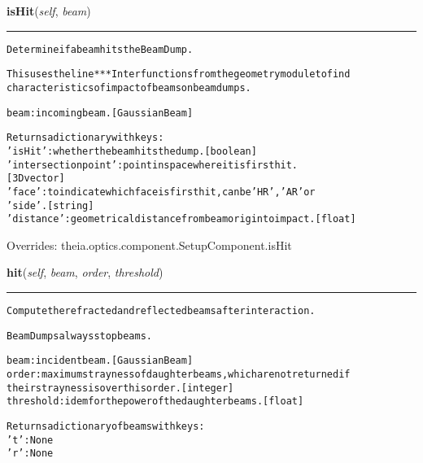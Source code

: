 \hspace{.8\funcindent}\begin{boxedminipage}{\funcwidth}

    \raggedright \textbf{isHit}(\textit{self}, \textit{beam})

    \vspace{-1.5ex}

    \rule{\textwidth}{0.5\fboxrule}
\setlength{\parskip}{2ex}
\begin{alltt}
Determine if a beam hits the BeamDump.

This uses the line***Inter functions from the geometry module to find
characteristics of impact of beams on beamdumps.

beam: incoming beam. [GaussianBeam]

Returns a dictionary with keys:
    'isHit': whether the beam hits the dump. [boolean]
    'intersection point': point in space where it is first hit.
        [3D vector]
    'face': to indicate which face is first hit, can be 'HR', 'AR' or
        'side'. [string]
    'distance': geometrical distance from beam origin to impact. [float]
\end{alltt}

\setlength{\parskip}{1ex}
      Overrides: theia.optics.component.SetupComponent.isHit

    \end{boxedminipage}

    \label{theia:optics:beamdump:BeamDump:hit}

    \vspace{0.5ex}

\hspace{.8\funcindent}\begin{boxedminipage}{\funcwidth}

    \raggedright \textbf{hit}(\textit{self}, \textit{beam}, \textit{order}, \textit{threshold})

    \vspace{-1.5ex}

    \rule{\textwidth}{0.5\fboxrule}
\setlength{\parskip}{2ex}
\begin{alltt}
Compute the refracted and reflected beams after interaction.

BeamDumps always stop beams.

beam: incident beam. [GaussianBeam]
order: maximum strayness of daughter beams, which are not returned if
    their strayness is over this order. [integer]
threshold: idem for the power of the daughter beams. [float]

Returns a dictionary of beams with keys:
    't': None
    'r': None
\end{alltt}

\setlength{\parskip}{1ex}
    \end{boxedminipage}



